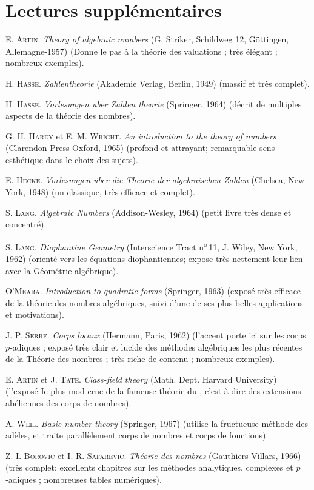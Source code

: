 \documentclass[11pt, %
  title in boldface,
  theorem in new line,
  theorem numbering = section,
  number theorems separately,
  simple name,
]{beaulivre}
\begin{document}
\chapter{Lectures supplémentaires}

\begin{hangparas}{1.2em}{1}
    \textsc{E. Artin}. \textit{Theory of algebraic numbers} (G. Striker, Schildweg 12, Göttingen, Allemagne-1957) (Donne le pas à la théorie des valuations ; très élégant ; nombreux exemples).

    \medskip
    \textsc{H. Hasse}. \textit{Zahlentheorie} (Akademie Verlag, Berlin, 1949) (massif et très complet).

    \medskip
    \textsc{H. Hasse}. \textit{Vorlesungen über Zahlen theorie} (Springer, 1964) (décrit de multiples aspects de la théorie des nombres).

    \medskip
    \textsc{G. H. Hardy} et \textsc{E. M. Wright}. \textit{An introduction to the theory of numbers} (Clarendon Press-Oxford, 1965) (profond et attrayant; remarquable sens esthétique dans le choix des sujets).

    \medskip
    \textsc{E. Hecke}. \textit{Vorlesungen über die Theorie der algebraischen Zahlen} (Chelsea, New York, 1948) (un classique, très efficace et complet).

    \medskip
    \textsc{S. Lang}. \textit{Algebraic Numbers} (Addison-Wesley, 1964) (petit livre très dense et concentré).

    \medskip
    \textsc{S. Lang}. \textit{Diophantine Geometry} (Interscience Tract n\textsuperscript{o}\,11, J. Wiley, New York, 1962) (orienté vers les équations diophantiennes; expose très nettement leur lien avec la Géométrie algébrique).

    \medskip
    \textsc{O'Meara}. \textit{Introduction to quadratic forms} (Springer, 1963) (exposé très efficace de la théorie des nombres algébriques, suivi d'une de ses plus belles applications et motivations).

    \medskip
    \textsc{J. P. Serre}. \textit{Corps locaux} (Hermann, Paris, 1962) (l'accent porte ici sur les corps \( p \)‑adiques ; exposé très clair et lucide des méthodes algébriques les plus récentes de la Théorie des nombres ; très riche de contenu ; nombreux exemples).

    \medskip
    \textsc{E. Artin} et \textsc{J. Tate}. \textit{Class-field theory} (Math. Dept. Harvard University) (l'exposé Ie plus mod erne de la fameuse théorie du , c'est-à-dire des extensions abéliennes des corps de nombres).

    \medskip
    \textsc{A. Weil}. \textit{Basic number theory} (Springer, 1967) (utilise la fructueuse méthode des adèles, et traite parallèlement corps de nombres et corps de fonctions).

    \medskip
    \textsc{Z. I. Borovic} et \textsc{I. R. Safarevic}. \textit{Théorie des nombres} (Gauthiers Villars, 1966) (très complet; excellents chapitres sur les méthodes analytiques, complexes et \( p \)‑adiques ; nombreuses tables numériques).
\end{hangparas}


\printindex
\end{document}
